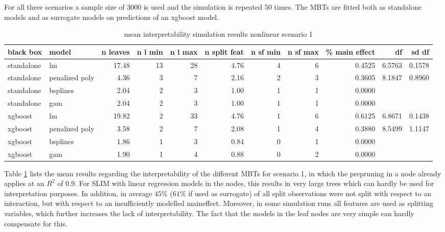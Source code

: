 For all three scenarios a sample size of 3000 is used and the simulation is repeated 50 times. The MBTs are fitted both as standalone models and as surrogate models on predictions of an xgboost model.


\begin{table}[!htb]
\centering \tiny
\begin{tabular}[t]{l|l|r|r|r|r|r|r|r|r|r}
\hline
black box & model & n leaves & n l min & n l max & n split feat & n sf min & n sf max & \% main effect & df & sd df\\
\hline
standalone & lm & 17.48 & 13 & 28 & 4.76 & 4 & 6 & 0.4525 & 6.5763 & 0.1578\\
standalone & penalized poly & 4.36 & 3 & 7 & 2.16 & 2 & 3 & 0.3605 & 8.1847 & 0.8960\\
standalone & bsplines & 2.04 & 2 & 3 & 1.00 & 1 & 1 & 0.0000 &  & \\
standalone & gam & 2.04 & 2 & 3 & 1.00 & 1 & 1 & 0.0000 &  & \\
\hline
xgboost & lm & 19.82 & 2 & 33 & 4.76 & 1 & 6 & 0.6125 & 6.8671 & 0.1438\\
xgboost & penalized poly & 3.58 & 2 & 7 & 2.08 & 1 & 4 & 0.3880 & 8.5499 & 1.1147\\
xgboost & bsplines & 1.86 & 1 & 3 & 0.84 & 0 & 1 & 0.0000 &  & \\
xgboost & gam & 1.90 & 1 & 4 & 0.88 & 0 & 2 & 0.0000 &  & \\

\hline
\end{tabular}
\caption{mean interpretability simulation results nonlinear scenario 1}
\label{tab:linear_mixed_1_interpretability}

\end{table}

Table \ref{tab:linear_mixed_1_interpretability} lists the mean results regarding the interpretability of the different MBTs for scenario 1, in which the prepruning in a node already applies at an $R^2$ of 0.9. For SLIM with linear regression models in the nodes, this results in very large trees which can hardly be used for interpretation purposes.
In addition, in average $45\%$ ($61\%$ if used as surrogate) of all split observations were not split with respect to an interaction, but with respect to an insufficiently modelled maineffect. Moreover, in some simulation runs all features are used as splitting variables, which further increases the lack of interpretability.
The fact that the models in the leaf nodes are very simple can hardly compensate for this. 

